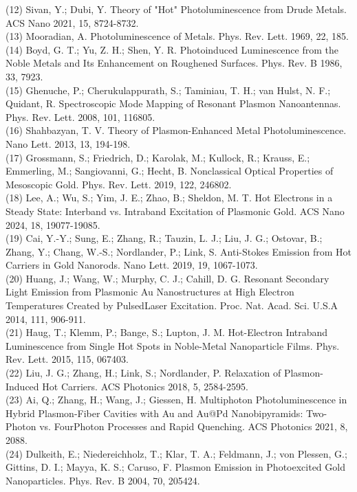 \documentclass[10pt]{article}
\begin{document}
(12) Sivan, Y.; Dubi, Y. Theory of "Hot" Photoluminescence from Drude Metals. ACS Nano 2021, 15, 8724-8732.\\
(13) Mooradian, A. Photoluminescence of Metals. Phys. Rev. Lett. 1969, 22, 185.\\
(14) Boyd, G. T.; Yu, Z. H.; Shen, Y. R. Photoinduced Luminescence from the Noble Metals and Its Enhancement on Roughened Surfaces. Phys. Rev. B 1986, 33, 7923.\\
(15) Ghenuche, P.; Cherukulappurath, S.; Taminiau, T. H.; van Hulst, N. F.; Quidant, R. Spectroscopic Mode Mapping of Resonant Plasmon Nanoantennas. Phys. Rev. Lett. 2008, 101, 116805.\\
(16) Shahbazyan, T. V. Theory of Plasmon-Enhanced Metal Photoluminescence. Nano Lett. 2013, 13, 194-198.\\
(17) Grossmann, S.; Friedrich, D.; Karolak, M.; Kullock, R.; Krauss, E.; Emmerling, M.; Sangiovanni, G.; Hecht, B. Nonclassical Optical Properties of Mesoscopic Gold. Phys. Rev. Lett. 2019, 122, 246802.\\
(18) Lee, A.; Wu, S.; Yim, J. E.; Zhao, B.; Sheldon, M. T. Hot Electrons in a Steady State: Interband vs. Intraband Excitation of Plasmonic Gold. ACS Nano 2024, 18, 19077-19085.\\
(19) Cai, Y.-Y.; Sung, E.; Zhang, R.; Tauzin, L. J.; Liu, J. G.; Ostovar, B.; Zhang, Y.; Chang, W.-S.; Nordlander, P.; Link, S. Anti-Stokes Emission from Hot Carriers in Gold Nanorods. Nano Lett. 2019, 19, 1067-1073.\\
(20) Huang, J.; Wang, W.; Murphy, C. J.; Cahill, D. G. Resonant Secondary Light Emission from Plasmonic Au Nanostructures at High Electron Temperatures Created by PulsedLaser Excitation. Proc. Nat. Acad. Sci. U.S.A 2014, 111, 906-911.\\
(21) Haug, T.; Klemm, P.; Bange, S.; Lupton, J. M. Hot-Electron Intraband Luminescence from Single Hot Spots in Noble-Metal Nanoparticle Films. Phys. Rev. Lett. 2015, 115, 067403.\\
(22) Liu, J. G.; Zhang, H.; Link, S.; Nordlander, P. Relaxation of Plasmon-Induced Hot Carriers. ACS Photonics 2018, 5, 2584-2595.\\
(23) Ai, Q.; Zhang, H.; Wang, J.; Giessen, H. Multiphoton Photoluminescence in Hybrid Plasmon-Fiber Cavities with Au and Au@Pd Nanobipyramids: Two-Photon vs. FourPhoton Processes and Rapid Quenching. ACS Photonics 2021, 8, 2088.\\
(24) Dulkeith, E.; Niedereichholz, T.; Klar, T. A.; Feldmann, J.; von Plessen, G.; Gittins, D. I.; Mayya, K. S.; Caruso, F. Plasmon Emission in Photoexcited Gold Nanoparticles. Phys. Rev. B 2004, 70, 205424.\\
\end{document}
